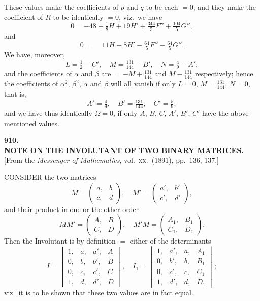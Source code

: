 \documentclass[11pt,a4paper]{article}
\begin{document}
These values make the coefficients of $p$ and $q$ to be each $= 0$; and they make the coefficient of $R$ to be identically $= 0$, viz.\ we have
\[
0 = - 48 + \tfrac{1}{8} H + 19 H' + \tfrac{344}{5} F'' + \tfrac{104}{5} G'',
\]
and
\[
0 = \phantom{-}11 H - 8 H' - \tfrac{64}{5} F'' - \tfrac{64}{5} G''.
\]
We have, moreover,
\[
L = \tfrac{1}{2} - C',\quad M = \tfrac{131}{144} - B',\quad N = \tfrac{4}{9} - A';
\]
and the coefficients of $\alpha$ and $\beta$ are $= - M + \tfrac{131}{144}$ and $M - \tfrac{131}{144}$ respectively; hence the coefficients of $\alpha^2$, $\beta^2$, $\alpha$ and $\beta$ will all vanish if only $L = 0$, $M = \tfrac{131}{144}$, $N = 0$, that is,
\[
A' = \tfrac{4}{9},\quad B' = \tfrac{131}{144},\quad C' = \tfrac{5}{9};
\]
and we have thus identically $\Omega = 0$, if only $A$, $B$, $C$, $A'$, $B'$, $C'$ have the above-mentioned values.

\clearpage

\begin{center}
{\large\bfseries 910.}\\[0.5em]
{\large\bfseries NOTE ON THE INVOLUTANT OF TWO BINARY MATRICES.}\\[0.5em]
\small [From the \emph{Messenger of Mathematics}, vol.\ \textsc{xx}.\ (1891), pp.\ 136, 137.]
\end{center}
\medskip

\noindent CONSIDER the two matrices
\[
M = \begin{pmatrix} a, & b \\ c, & d \end{pmatrix},\quad M' = \begin{pmatrix} a', & b' \\ c', & d' \end{pmatrix},
\]
and their product in one or the other order
\[
M M' = \begin{pmatrix} A, & B \\ C, & D \end{pmatrix},\quad M' M = \begin{pmatrix} A_1, & B_1 \\ C_1, & D_1 \end{pmatrix}.
\]
Then the Involutant is by definition $=$ either of the determinants
\[
I = \begin{vmatrix} 1, & a, & a', & A \\ 0, & b, & b', & B \\ 0, & c, & c', & C \\ 1, & d, & d', & D \end{vmatrix},\quad I_1 = \begin{vmatrix} 1, & a', & a, & A_1 \\ 0, & b', & b, & B_1 \\ 0, & c', & c, & C_1 \\ 1, & d', & d, & D_1 \end{vmatrix};
\]
viz.\ it is to be shown that these two values are in fact equal.
\end{document}
